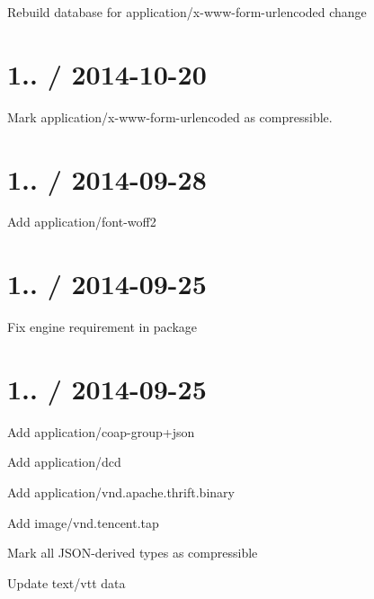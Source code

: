 \begin{DoxyItemize}
\item Rebuild database for {\ttfamily application/x-\/www-\/form-\/urlencoded} change
\end{DoxyItemize}

\section*{1.. / 2014-\/10-\/20 }


\begin{DoxyItemize}
\item Mark {\ttfamily application/x-\/www-\/form-\/urlencoded} as compressible.
\end{DoxyItemize}

\section*{1.. / 2014-\/09-\/28 }


\begin{DoxyItemize}
\item Add {\ttfamily application/font-\/woff2}
\end{DoxyItemize}

\section*{1.. / 2014-\/09-\/25 }


\begin{DoxyItemize}
\item Fix engine requirement in package
\end{DoxyItemize}

\section*{1.. / 2014-\/09-\/25 }


\begin{DoxyItemize}
\item Add {\ttfamily application/coap-\/group+json}
\item Add {\ttfamily application/dcd}
\item Add {\ttfamily application/vnd.\+apache.\+thrift.\+binary}
\item Add {\ttfamily image/vnd.\+tencent.\+tap}
\item Mark all J\+S\+O\+N-\/derived types as compressible
\item Update {\ttfamily text/vtt} data
\end{DoxyItemize}

